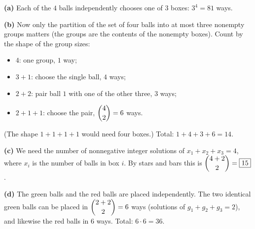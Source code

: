 \textbf{(a)} Each of the $4$ balls independently chooses one of $3$ boxes: $3^4=\boxed{81}$ ways.

\textbf{(b)} Now only the partition of the set of four balls into at most three nonempty groups matters (the groups are the contents of the nonempty boxes). Count by the shape of the group sizes:
\begin{itemize}
\item $4$: one group, $1$ way;
\item $3+1$: choose the single ball, $4$ ways;
\item $2+2$: pair ball $1$ with one of the other three, $3$ ways;
\item $2+1+1$: choose the pair, $\dbinom42=6$ ways.
\end{itemize}
(The shape $1+1+1+1$ would need four boxes.) Total: $1+4+3+6=\boxed{14}$.

\textbf{(c)} We need the number of nonnegative integer solutions of $x_1+x_2+x_3=4$, where $x_i$ is the number of balls in box $i$. By stars and bars this is $\dbinom{4+2}{2}=\boxed{15}$.

\textbf{(d)} The green balls and the red balls are placed independently. The two identical green balls can be placed in $\dbinom{2+2}{2}=6$ ways (solutions of $g_1+g_2+g_3=2$), and likewise the red balls in $6$ ways. Total: $6\cdot6=\boxed{36}$.
